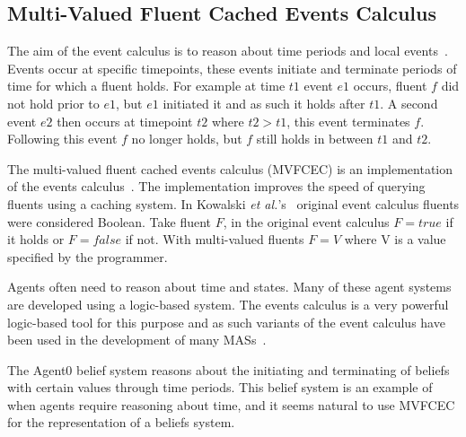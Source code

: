 \documentclass[]{final_report}
\begin{document}
\subsection{Multi-Valued Fluent Cached Events Calculus}
The aim of the event calculus is to reason about time periods and local events~\cite{kowalski1989logic}. Events occur at specific timepoints, these events initiate and terminate periods of time for which a fluent holds. For example at time $t1$ event $e1$ occurs, fluent $f$ did not hold prior to $e1$, but $e1$ initiated it and as such it holds after $t1$. A second event $e2$ then occurs at timepoint $t2$ where $t2>t1$, this event terminates $f$. Following this event $f$ no longer holds, but $f$ still holds in between $t1$ and $t2$.\par
The multi-valued fluent cached events calculus (MVFCEC) is an implementation of the events calculus~\cite{mvfcec}. The implementation improves the speed of querying fluents using a caching system. In Kowalski \textit{et al.}'s~\cite{kowalski1989logic} original event calculus fluents were considered Boolean. Take fluent $F$, in the original event calculus $F=true$ if it holds or $F=false$ if not. With multi-valued fluents $F=V$ where V is a value specified by the programmer.\par 
Agents often need to reason about time and states. Many of these agent systems are developed using a logic-based system. The events calculus is a very powerful logic-based tool for this purpose and as such variants of the event calculus have been used in the development of many MASs~\cite{artikis2009specifying, mvfcec}.\par 
The Agent0 belief system reasons about the initiating and terminating of beliefs with certain values through time periods. This belief system is an example of when agents require reasoning about time, and it seems natural to use MVFCEC for the representation of a beliefs system.
\end{document}
